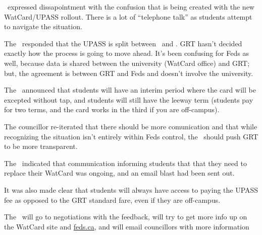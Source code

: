 \begin{information}
    \stephanie\ expressed dissapointment with the confusion that is being created
    with the new WatCard/UPASS rollout. There is a lot of ``telephone talk'' as
    students attempt to navigate the situation. 

    The \vped\ responded that the UPASS is split between \vped\ and \vpof. 
    GRT hasn't decided exactly how the process is going to move ahead. It's 
    been confusing for Feds as well, because data is shared between the 
    university (WatCard office) and GRT; but, the agreement is between GRT and 
    Feds and doesn't involve the university. 

    The \vped\ announced that students will have an interim period where the
    card will be excepted without tap, and students will still have the leeway
    term (students pay for two terms, and the card works in the third if you
    are off-campus).

    The councillor re-iterated that there should be more comunication and that
    while recognizing the situation isn't entirely within Feds control, the 
    \vped\ should push GRT to be more transparent.

    The \pres\ indicated that communication informing students that that they
    need to replace their WatCard was ongoing, and an email blast had been
    sent out. 

    It was also made clear that students will always have access to paying the
    UPASS fee as opposed to the GRT standard fare, even if they are off-campus.

    The \vped\ will go to negotiations with the feedback, will try to get
    more info up on the WatCard site and \url{feds.ca}, and will email 
    councillors with more information
\end{information}
